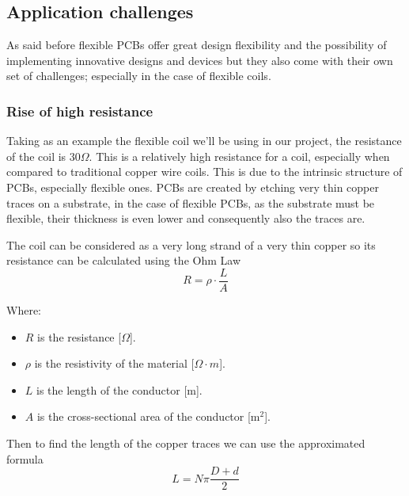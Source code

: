 \def\perm_air{4*\pi*1e-7} %
\def\spires{35}
\def\res_coil{30} %
\def\coil_ext_r{7.9e-3} %
\def\coil_int_r{1.016e-4} %



\subsection{Application challenges}
\label{subsec: Application challenges}
As said before flexible PCBs offer great design flexibility and the possibility of implementing innovative designs and devices but they also come with their own set of challenges; especially in the case of flexible coils.

\subsubsection{Rise of high resistance}
Taking as an example the flexible coil we'll be using in our project, the resistance of the coil is 30\(\Omega\). This is a relatively high resistance for a coil, especially when compared to traditional copper wire coils. 
This is due to the intrinsic structure of PCBs, especially flexible ones.
PCBs are created by etching very thin copper traces on a substrate, in the case of flexible PCBs, as the substrate must be flexible, their thickness is even lower and consequently also the traces are.

The coil can be considered as a very long strand of a very thin copper so its resistance can be calculated using the Ohm Law
\begin{equation}
    R=\rho \cdot \frac{L}{A}
\end{equation}

Where:
\begin{itemize}
    \item \( R \) is the resistance [\(\Omega\)].
    \item \( \rho \) is the resistivity of the material [\(\Omega \cdot m\)].
    \item \( L \) is the length of the conductor [m].
    \item \( A \) is the cross-sectional area of the conductor [m\(^2\)].
\end{itemize}

Then to find the length of the copper traces we can use the approximated formula \cite{Length_of_a_Spiral}
\begin{equation}
    L = N \pi \frac{D+d}{2}
\end{equation} 

